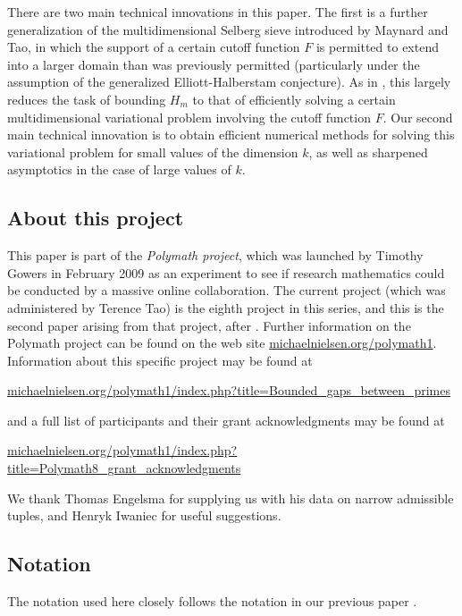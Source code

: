 There are two main technical innovations in this paper.  The first is a further generalization of the multidimensional Selberg sieve introduced by Maynard and Tao, in which the support of a certain cutoff function $F$ is permitted to extend into a larger domain than was previously permitted (particularly under the assumption of the generalized Elliott-Halberstam conjecture).  As in \cite{maynard}, this largely reduces the task of bounding $H_m$ to that of efficiently solving a certain multidimensional variational problem involving the cutoff function $F$.  Our second main technical innovation is to obtain efficient numerical methods for solving this variational problem for small values of the dimension $k$, as well as sharpened asymptotics in the case of large values of $k$.

\subsection{About this project}

This paper is part of the \emph{Polymath project}, which was launched
by Timothy Gowers in February 2009 as an experiment to see if research
mathematics could be conducted by a massive online collaboration.
The current project (which was administered by Terence Tao) is the eighth
project in this series, and this is the second paper arising from that project, after \cite{polymath8a}.  Further information on the Polymath project can be
found on the web site \url{michaelnielsen.org/polymath1}.  Information
about this specific project may be found at
\begin{center}
\small{\url{michaelnielsen.org/polymath1/index.php?title=Bounded\_gaps\_between\_primes}}
\end{center}
and a full list of participants and their grant acknowledgments may be
found at
\begin{center}
\small{\url{michaelnielsen.org/polymath1/index.php?title=Polymath8\_grant\_acknowledgments}}
\end{center}
\par
We thank Thomas Engelsma for supplying us with his data on narrow admissible tuples, and Henryk Iwaniec for useful suggestions.

\subsection{Notation}

The notation used here closely follows the notation in our previous paper \cite{polymath8a}.

